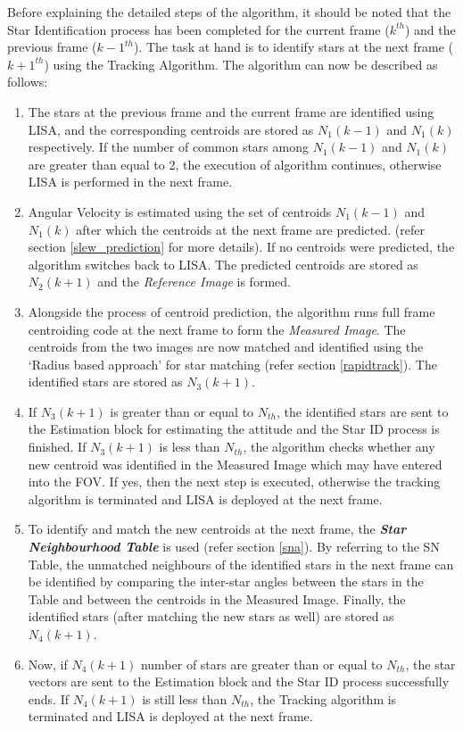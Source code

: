 \documentclass[../../main.tex]{subfiles}
\begin{document}
Before explaining the detailed steps of the algorithm, it should be noted that the Star Identification process has been completed for the current frame ($k^{th}$) and the previous frame ($k-1^{th}$). The task at hand is to identify stars at the next frame ($k+1^{th}$) using the Tracking Algorithm. The algorithm can now be described as follows: 
\begin{enumerate}
    \item The stars at the previous frame and the current frame are identified using LISA, and the corresponding centroids are stored as $N_{1}(k-1)$ and $N_{1}(k)$ respectively. If the number of common stars among $N_{1}(k-1)$ and $N_{1}(k)$ are greater than equal to 2, the execution of algorithm continues, otherwise LISA is performed in the next frame. 
    \item Angular Velocity is estimated using the set of centroids $N_{1}(k-1)$ and $N_{1}(k)$ after which the centroids at the next frame are predicted. (refer section \ref{slew_prediction} for more details). If no centroids were predicted, the algorithm switches back to LISA. The predicted centroids are stored as $N_{2}(k+1)$ and the \emph{Reference Image} is formed. 
    \item Alongside the process of centroid prediction, the algorithm runs full frame centroiding code at the next frame to form the \emph{Measured Image}. The centroids from the two images are now matched and identified using the `Radius based approach' for star matching (refer section \ref{rapidtrack}). The identified stars are stored as $N_{3}(k+1)$. 
    \item If $N_{3}(k+1)$ is greater than or equal to $N_{th}$, the identified stars are sent to the Estimation block for estimating the attitude and the Star ID process is finished. If $N_{3}(k+1)$ is less than $N_{th}$, the algorithm checks whether any new centroid was identified in the Measured Image which may have entered into the FOV. If yes, then the next step is executed, otherwise the tracking algorithm is terminated and LISA is deployed at the next frame. 
    \item To identify and match the new centroids at the next frame, the \textbf{\emph{Star Neighbourhood Table}} is used (refer section \ref{sna}). By referring to the SN Table, the unmatched neighbours of the identified stars in the next frame can be identified by comparing the inter-star angles between the stars in the Table and between the centroids in the Measured Image. Finally, the identified stars (after matching the new stars as well) are stored as $N_{4}(k+1)$. 
    \item Now, if $N_{4}(k+1)$ number of stars are greater than or equal to $N_{th}$, the star vectors are sent to the Estimation block and the Star ID process successfully ends. If $N_{4}(k+1)$ is still less than $N_{th}$, the Tracking algorithm is terminated and LISA is deployed at the next frame. 
\end{enumerate}
\end{document}

